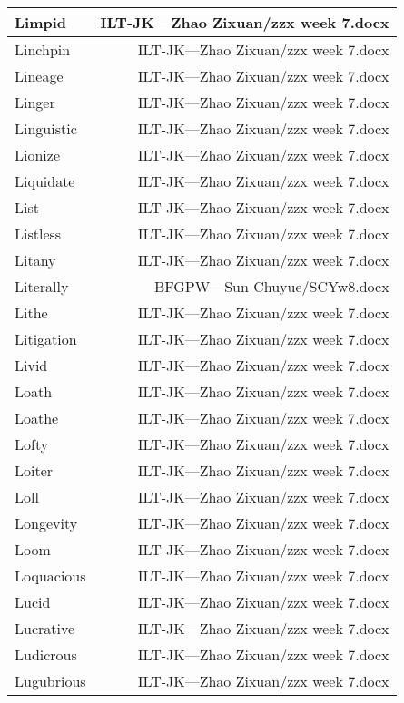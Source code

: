 \documentclass{article}
\begin{document}
\begin{center}
\begin{longtable}{|l|r|}
\hline
Limpid  &  ILT-JK---Zhao Zixuan/zzx week 7.docx\\  
\hline
Linchpin  &  ILT-JK---Zhao Zixuan/zzx week 7.docx\\  
\hline
Lineage  &  ILT-JK---Zhao Zixuan/zzx week 7.docx\\  
\hline
Linger  &  ILT-JK---Zhao Zixuan/zzx week 7.docx\\  
\hline
Linguistic  &  ILT-JK---Zhao Zixuan/zzx week 7.docx\\  
\hline
Lionize  &  ILT-JK---Zhao Zixuan/zzx week 7.docx\\  
\hline
Liquidate  &  ILT-JK---Zhao Zixuan/zzx week 7.docx\\  
\hline
List  &  ILT-JK---Zhao Zixuan/zzx week 7.docx\\  
\hline
Listless  &  ILT-JK---Zhao Zixuan/zzx week 7.docx\\  
\hline
Litany  &  ILT-JK---Zhao Zixuan/zzx week 7.docx\\  
\hline
Literally  &  BFGPW---Sun Chuyue/SCYw8.docx\\  
\hline
Lithe  &  ILT-JK---Zhao Zixuan/zzx week 7.docx\\  
\hline
Litigation  &  ILT-JK---Zhao Zixuan/zzx week 7.docx\\  
\hline
Livid  &  ILT-JK---Zhao Zixuan/zzx week 7.docx\\  
\hline
Loath  &  ILT-JK---Zhao Zixuan/zzx week 7.docx\\  
\hline
Loathe  &  ILT-JK---Zhao Zixuan/zzx week 7.docx\\  
\hline
Lofty  &  ILT-JK---Zhao Zixuan/zzx week 7.docx\\  
\hline
Loiter  &  ILT-JK---Zhao Zixuan/zzx week 7.docx\\  
\hline
Loll  &  ILT-JK---Zhao Zixuan/zzx week 7.docx\\  
\hline
Longevity  &  ILT-JK---Zhao Zixuan/zzx week 7.docx\\  
\hline
Loom  &  ILT-JK---Zhao Zixuan/zzx week 7.docx\\  
\hline
Loquacious  &  ILT-JK---Zhao Zixuan/zzx week 7.docx\\  
\hline
Lucid  &  ILT-JK---Zhao Zixuan/zzx week 7.docx\\  
\hline
Lucrative  &  ILT-JK---Zhao Zixuan/zzx week 7.docx\\  
\hline
Ludicrous  &  ILT-JK---Zhao Zixuan/zzx week 7.docx\\  
\hline
Lugubrious  &  ILT-JK---Zhao Zixuan/zzx week 7.docx\\  
\hline

\end{longtable}
\end{center}
\end{document}
